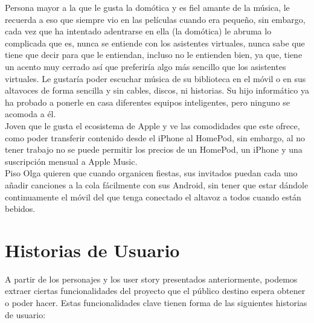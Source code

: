 Persona mayor a la que le gusta la domótica y es fiel amante de la música, le
recuerda a eso que siempre vio en las películas cuando era pequeño, sin embargo,
cada vez que ha intentado adentrarse en ella (la domótica) le abruma lo
complicada que es, nunca se entiende con los asistentes virtuales, nunca sabe
que tiene que decir para que le entiendan, incluso no le entienden bien, ya que,
tiene un acento muy cerrado así que preferiría algo más sencillo que los
asistentes virtuales. Le gustaría poder escuchar música de su biblioteca en el
móvil o en sus altavoces de forma sencilla y sin cables, discos, ni historias.
Su hijo informático ya ha probado a ponerle en casa diferentes equipos
inteligentes, pero ninguno se acomoda a él.\\

Joven que le gusta el ecosistema de Apple y ve las comodidades que este ofrece,
como poder transferir contenido desde el iPhone al HomePod, sin embargo, al no
tener trabajo no se puede permitir los precios de un HomePod, un iPhone y una
suscripción mensual a Apple Music.\\

Piso Olga quieren que cuando organicen fiestas, sus invitados puedan cada uno
añadir canciones a la cola fácilmente con sus Android, sin tener que estar
dándole continuamente el móvil del que tenga conectado el altavoz a todos cuando
están bebidos.\\

\section{Historias de Usuario}
A partir de los personajes y los user story presentados anteriormente, podemos
extraer ciertas funcionalidades del proyecto que el público destino espera
obtener o poder hacer. Estas funcionalidades clave tienen forma de las
siguientes historias de usuario:

